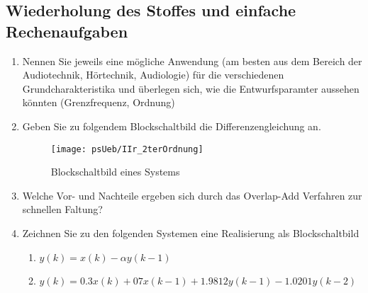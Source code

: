 \subsection{Wiederholung des Stoffes und einfache Rechenaufgaben}
\begin{enumerate}
    \item Nennen Sie jeweils eine mögliche Anwendung (am besten aus dem Bereich
    der Audiotechnik, Hörtechnik, Audiologie) für die verschiedenen Grundcharakteristika
    und überlegen sich, wie die Entwurfsparamter aussehen könnten (Grenzfrequenz, Ordnung)
    \item Geben Sie zu folgendem Blockschaltbild die Differenzengleichung an.
        \begin{figure}[H]
        \begin{center}
        \texttt{[image: psUeb/IIr\_2terOrdnung]}
        \caption{\label{pic:IIR_System} Blockschaltbild eines Systems}
        \end{center}
        \end{figure}
    \item Welche Vor- und Nachteile ergeben sich durch das Overlap-Add Verfahren zur schnellen
    Faltung?
    \item Zeichnen Sie zu den folgenden Systemen eine Realisierung als Blockschaltbild
    \begin{enumerate}
        \item $y(k) = x(k) - \alpha y(k-1)$
        \item $y(k) =  0.3 x(k) + 07 x(k-1) + 1.9812 y(k-1)   - 1.0201 y(k-2)$
    \end{enumerate}
\end{enumerate}

